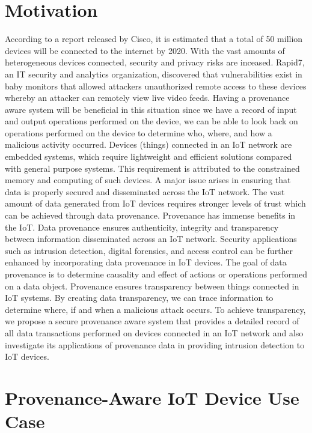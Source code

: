 \section{Motivation}
According to a report released by Cisco, it is estimated that a total of 50 million devices will be
connected to the internet by 2020. With the vast amounts of heterogeneous devices connected,
security and privacy risks are inceased. Rapid7, an  IT security and analytics organization, discovered that vulnerabilities exist in
baby monitors that allowed attackers unauthorized remote access to these devices
whereby an attacker can remotely view live video feeds. Having a provenance aware
system will be beneficial in this situation since we have a record of input and output
operations performed on the device, we can be able to look back on operations
performed on the device to determine who, where, and how a malicious activity
occurred. Devices (things) connected in an IoT network are embedded systems, which
require lightweight and efficient solutions compared with general purpose
systems.
This requirement is attributed to the constrained memory and computing of such
devices. A major issue arises in ensuring that data is properly secured and
disseminated across the IoT network. The vast amount of data generated from IoT
devices requires stronger levels of trust which can be achieved through data
provenance. Provenance has immense benefits in the IoT. Data provenance ensures
authenticity, integrity and transparency between information disseminated across an
IoT network. Security applications such as intrusion detection, digital forensics, and
access control can be further enhanced by incorporating data provenance in IoT
devices. The goal of data provenance is to determine causality and effect of actions or
operations performed on a data object. Provenance ensures transparency between things
connected in IoT systems. By creating data transparency, we can trace information to
determine where, if and when a malicious attack occurs. To achieve transparency, we
propose a secure provenance aware system that provides a detailed record of all data
transactions performed on devices connected in an IoT network and also investigate its applications of provenance data in providing intrusion detection to IoT devices.

\section{Provenance-Aware IoT Device Use Case}

